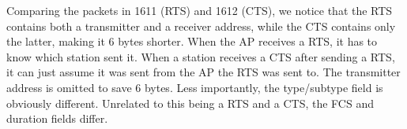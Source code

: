 Comparing the packets in 1611 (RTS) and 1612 (CTS), we notice that the RTS contains both a transmitter and a receiver address, while the CTS contains only the latter, making it 6 bytes shorter. When the AP receives a RTS, it has to know which station sent it. When a station receives a CTS after sending a RTS, it can just assume it was sent from the AP the RTS was sent to. The transmitter address is omitted to save 6 bytes. Less importantly, the type/subtype field is obviously different. Unrelated to this being a RTS and a CTS, the FCS and duration fields differ.
